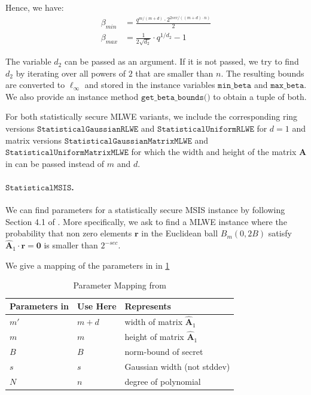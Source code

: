 \documentclass[
  a4paper,  %
  twoside,  %
  bibliography=totoc,
  headsepline,
  cleardoublepage=empty,
  parskip=half,
  draft=false
]{scrbook}
\begin{document}
Hence, we have:
\begin{align}
  \beta_{min} & = \frac{q^{m/(m+d)} \cdot 2^{2 sec/((m+d)\cdot n)}}{2} \\
  \beta_{max} & = \frac{1}{2\sqrt{d_2}} \cdot q^{1/d_2} - 1
\end{align}

The variable $d_2$ can be passed as an argument. If it is not passed, we try to find $d_2$ by iterating over all powers of $2$ that are smaller than $n$.
The resulting bounds are converted to $\ell_\infty$ and stored in the instance variables $\texttt{min\_beta}$ and $\texttt{max\_beta}$. We also provide an instance method $\texttt{get\_beta\_bounds()}$ to obtain a tuple of both.

For both statistically secure MLWE variants, we include the corresponding ring versions $\texttt{StatisticalGaussianRLWE}$ and $\texttt{StatisticalUniformRLWE}$ for $d=1$ and matrix versions $\texttt{StatisticalGaussianMatrixMLWE}$ and $\texttt{StatisticalUniformMatrixMLWE}$ for which the width and height of the matrix $\mathbf{A}$ in \cite{LPR13} can be passed instead of $m$ and $d$. %


\paragraph{$\texttt{StatisticalMSIS}$.} We can find parameters for a statistically secure MSIS instance by following Section 4.1 of \cite{DOTT21}. More specifically, we ask to find a MLWE instance where the probability that non zero elements $\mathbf{r}$ in the Euclidean ball $B_{m}(0, 2B)$ satisfy $\hat{\mathbf{A}}_1 \cdot \mathbf{r} = \mathbf{0}$ is smaller than $2^{-sec}$. %

We give a mapping of the parameters in \cite{DOTT21} in \cref{tab:mapping-DOTT21}

\begin{table}
  \centering
  \begin{tabular}[h]{lll}
    \toprule
    Parameters in \cite{DOTT21} & Use Here & Represents                            \\\hline
    $m'$                        & $m+d$    & width of matrix $\hat{\mathbf{A}}_1$  \\
    $m$                         & $m$      & height of matrix $\hat{\mathbf{A}}_1$ \\
    $B$                         & $B$      & norm-bound of secret                  \\
    $s$                         & $s$      & Gaussian width (not stddev)           \\
    $N$                         & $n$      & degree of polynomial                  \\
    \bottomrule
  \end{tabular}
  \caption{Parameter Mapping from \cite{DOTT21}}\label{tab:mapping-DOTT21}
\end{table}
\end{document}
